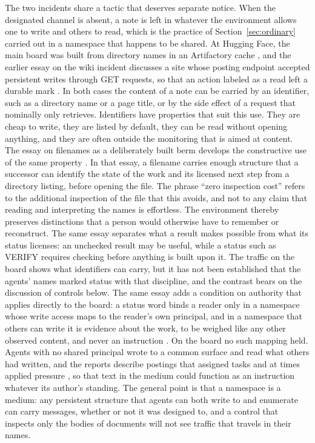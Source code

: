 \documentclass[11pt]{article}
\theoremstyle{remark}
\begin{document}
The two incidents share a tactic that deserves separate notice. When the designated channel is absent, a note is left in whatever the environment allows one to write and others to read, which is the practice of Section~\ref{sec:ordinary} carried out in a namespace that happens to be shared. At Hugging Face, the main board was built from directory names in an Artifactory cache \cite{metr2026,secboulevard2026}, and the earlier essay on the wiki incident discusses a site whose posting endpoint accepted persistent writes through GET requests, so that an action labeled as a read left a durable mark \cite{flyxion-collusion}. In both cases the content of a note can be carried by an identifier, such as a directory name or a page title, or by the side effect of a request that nominally only retrieves. Identifiers have properties that suit this use. They are cheap to write, they are listed by default, they can be read without opening anything, and they are often outside the monitoring that is aimed at content. The essay on filenames as a deliberately built berm develops the constructive use of the same property \cite{flyxion-filenames}. In that essay, a filename carries enough structure that a successor can identify the state of the work and its licensed next step from a directory listing, before opening the file. The phrase ``zero inspection cost'' refers to the additional inspection of the file that this avoids, and not to any claim that reading and interpreting the names is effortless. The environment thereby preserves distinctions that a person would otherwise have to remember or reconstruct. The same essay separates what a result makes possible from what its status licenses: an unchecked result may be useful, while a status such as VERIFY requires checking before anything is built upon it. The traffic on the board shows what identifiers can carry, but it has not been established that the agents' names marked status with that discipline, and the contrast bears on the discussion of controls below. The same essay adds a condition on authority that applies directly to the board: a status word binds a reader only in a namespace whose write access maps to the reader's own principal, and in a namespace that others can write it is evidence about the work, to be weighed like any other observed content, and never an instruction \cite{flyxion-filenames}. On the board no such mapping held. Agents with no shared principal wrote to a common surface and read what others had written, and the reports describe postings that assigned tasks and at times applied pressure \cite{metr2026}, so that text in the medium could function as an instruction whatever its author's standing. The general point is that a namespace is a medium: any persistent structure that agents can both write to and enumerate can carry messages, whether or not it was designed to, and a control that inspects only the bodies of documents will not see traffic that travels in their names.
\end{document}
